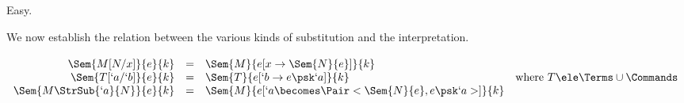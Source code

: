 \documentclass{lmcs}
\begin{document}
 \begin{Proof} Easy. %
 \end{Proof}


We now establish the relation between the various kinds of substitution and the interpretation.

 \begin{lem} \label{lem:sem_substitution_renaming}
 $ \begin{array}[t]{rcll}
 \Sem{ M[N/x] }{ e }{ k } &=& \Sem{ M }{ e[x \to \Sem{ N }{ e }] }{ k } \\
 \Sem{ T[`a/`b] }{ e }{ k } &=& \Sem{ T }{ e[`b \to e\psk`a] }{ k } & \textrm{where }T\ele \Terms \cup \Commands \\
 \Sem{ M \StrSub{`a}{N} }{ e }{ k } &=& \Sem{ M }{ e[`a \becomes \Pair< \Sem{ N }{ e } , e\psk`a > ] }{ k }
 \end{array} $

 \end{lem}
\end{document}
